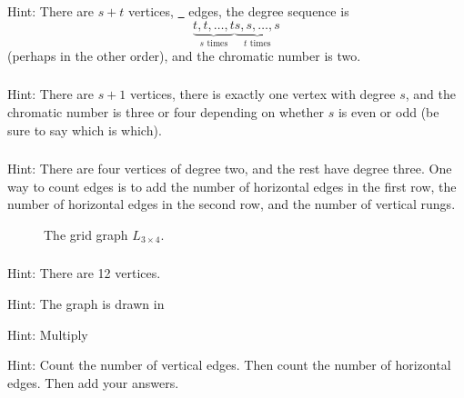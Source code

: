 \subsubsection*{ \answers}
    Hint: There are $s+t$ vertices, \underline{\quad~} edges, the degree sequence is $$\underbrace{t,t,\ldots, t}_{s \text{ times}}\underbrace{s,s,\ldots, s}_{t \text{ times}}$$
    (perhaps in the other order), and the chromatic number is two.

\subsubsection*{ \answers}
    Hint: There are $s+1$ vertices, there is exactly one vertex with degree $s$, and the chromatic number is three or four depending on whether $s$ is even or odd (be sure to say which is which).

\subsubsection*{ \answers}
    Hint: There are four vertices of degree two, and the rest have degree three. One way to count edges is to add the number of horizontal edges in the first row, the number of horizontal edges in the second row, and the number of vertical rungs.

    \begin{figure}[hbtp]
        \centering
        
        \caption{The grid graph $L_{3 \times 4}$.}
        \label{fig_grid_3x4}
    \end{figure}
    
\subsubsection*{ \answers}

    \begin{apart}
        \item Hint: There are 12 vertices.
        \item Hint: The graph is drawn in 
        \item Hint: Multiply
        \item Hint: Count the number of vertical edges.  Then count the number of horizontal edges.  Then add your answers.
    \end{apart}



